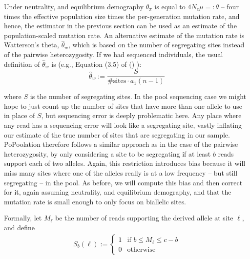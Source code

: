 \documentclass[a4paper,fontsize=9pt,DIV=14]{scrartcl}
\newcounter{todo}
\newcommand\todo[1]{}
\newcommand{\coverage}{c}
\newcommand\citeay[1]{\citeauthor{#1} (\citeyear{#1}) \cite{#1}}
\begin{document}


Under neutrality, and equilibrium demography $\theta_\pi$ is equal to $4N_e\mu =: \theta$ -- four times the effective population size times the per-generation mutation rate, and hence, the estimator in the previous section can be used as an estimate of the population-scaled mutation rate.  An alternative estimate of the mutation rate is Watterson's theta, $\widehat{\theta}_w$, which is based on the number of segregating sites instead of the pairwise heterozygosity.  If we had sequenced individuals, the usual definition of $\widehat{\theta}_w$ is (e.g., Equation (3.5) of \citeay{Hahn2018}):
\[
\widehat{\theta}_w := \frac{S}{\text{\# sites} \cdot a_1(n-1) }
\]
\todo{pretty sure that the $n$ in the denominator above is wrong, as $n$ is the pool size, but it should be coverage, or not? Jeff, can you please check?  JPS: this denominator is right -- the first paragraph up to here is talking about what we would do if we had sequenced \emph{individuals}}
where $S$ is the number of segregating sites. In the pool sequencing case we might hope to just count up the number of sites that have more than one allele to use in place of $S$, but sequencing error is deeply problematic here.  Any place where any read has a sequencing error will look like a segregating site, vastly inflating our estimate of the true number of sites that are segregating in our sample.  PoPoolation therefore follows a similar approach as in the case of the pairwise heterozygosity, by only considering a site to be segregating if at least $b$ reads support each of two alleles.  Again, this restriction introduces bias because it will miss many sites where one of the alleles really is at a low frequency -- but still segregating -- in the pool.  As before, we will compute this bias and then correct for it, again assuming neutrality, and equilibrium demography, and that the mutation rate is small enough to only focus on biallelic sites.


Formally, let $M_\ell$ be the number of reads supporting the derived allele at site $\ell$, and define
\begin{align}
    S_b(\ell) :=
    \begin{cases}
        1 & \text{if } b \le M_\ell \le \coverage-b
        \\
        0 & \text{otherwise}
    \end{cases}
\end{align}
%
\end{document}
